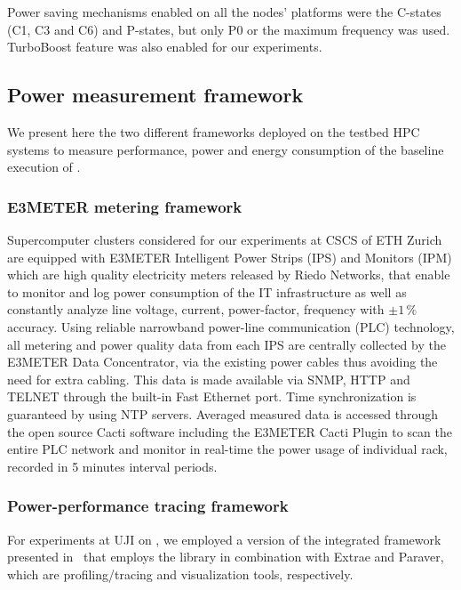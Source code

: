 Power saving mechanisms enabled on all the nodes' platforms were the C-states (C1, C3 and C6) 
and P-states, but only P0 or the maximum frequency was used. TurboBoost feature was also enabled for our experiments.

\subsection{Power measurement framework}
\label{subsec:3.3}

We present here  the two different frameworks deployed  on the testbed
HPC  systems  to measure  performance,  power and  energy
consumption of the baseline execution of \cosmoart.

\subsubsection{E3METER metering framework}

Supercomputer clusters  considered for our experiments at  CSCS of ETH
Zurich are  equipped with E3METER  Intelligent Power Strips  (IPS) and
Monitors (IPM)  which are high quality electricity  meters released by
Riedo Networks,  that enable to  monitor and log power  consumption of
the  IT infrastructure  as well  as constantly  analyze  line voltage,
current, power-factor, frequency  with $\pm1\,\%$ accuracy.  Using reliable
narrowband power-line communication (PLC) technology, all metering and
power  quality data  from  each  IPS are  centrally  collected by  the
E3METER Data Concentrator, via the existing power cables thus avoiding
the need  for extra  cabling.  This data  is made available  via SNMP,
HTTP  and  TELNET  through  the  built-in Fast  Ethernet  port.   Time
synchronization is guaranteed by  using NTP servers. Averaged measured data is
accessed through the open  source Cacti software including the E3METER
Cacti Plugin to  scan the entire PLC network  and monitor in real-time
the power  usage of  individual rack, recorded  in 5  minutes interval
periods.

\subsubsection{Power-performance tracing framework}

For  experiments  at UJI  on  \tinto, we  employed  a  version of  the
integrated  framework presented  in~\cite{energy13}  that employs  the
\pmlib  library in  combination  with Extrae  and  Paraver, which  are
profiling/tracing and visualization tools, respectively.

